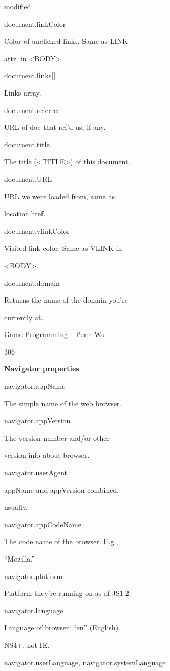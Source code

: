 \documentclass[
]{article}
\begin{document}
modified.

document.linkColor

Color of unclicked links. Same as LINK

attr. in \textless BODY\textgreater.

document.links{[}{]}

Links array.

document.referrer

URL of doc that ref'd us, if any.

document.title

The title (\textless TITLE\textgreater) of this document.

document.URL

URL we were loaded from, same as

location.href.

document.vlinkColor

Visited link color. Same as VLINK in

\textless BODY\textgreater.

document.domain

Returns the name of the domain you're

currently at.

Game Programming -- Penn Wu

306

\protect\hypertarget{index_split_015.htmlux5cux23p307}{}{}

\textbf{Navigator properties}

navigator.appName

The simple name of the web browser.

navigator.appVersion

The version number and/or other

version info about browser.

navigator.userAgent

appName and appVersion combined,

usually.

navigator.appCodeName

The code name of the browser. E.g.,

``Mozilla.''

navigator.platform

Platform they're running on as of JS1.2.

navigator.language

Language of browser. ``en'' (English).

NS4+, not IE.

navigator.userLanguage, navigator.systemLanguage
\end{document}
